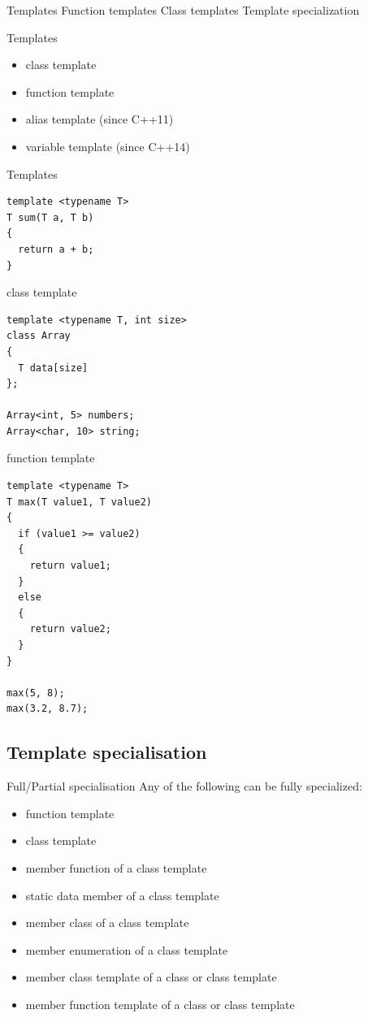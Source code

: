 \documentclass{beamer}
\begin{document}
\begin{frame}{Templates}
Function templates
Class templates
Template specialization
\end{frame}

\begin{frame}{Templates}
\begin{itemize}
  \item class template
  \item function template
  \item alias template (since C++11)
  \item variable template (since C++14)
\end{itemize}
\end{frame}

\begin{frame}[fragile]{Templates}
\begin{lstlisting}[caption=Templates]
template <typename T>
T sum(T a, T b)
{
  return a + b;
}\end{lstlisting}
\end{frame}

\begin{frame}[fragile]{class template}
\begin{lstlisting}
template <typename T, int size>
class Array
{
  T data[size]
};

Array<int, 5> numbers;
Array<char, 10> string;
\end{lstlisting}
\end{frame}

\begin{frame}[fragile]{function template}
\begin{lstlisting}
template <typename T>
T max(T value1, T value2)
{
  if (value1 >= value2)
  {
    return value1;
  }
  else
  {
    return value2;
  }
}

max(5, 8);
max(3.2, 8.7);
\end{lstlisting}
\end{frame}

\subsection{Template specialisation}
\begin{frame}{Full/Partial specialisation}
Any of the following can be fully specialized:
\begin{itemize}
  \item function template
  \item class template 
  \item member function of a class template
  \item static data member of a class template
  \item member class of a class template
  \item member enumeration of a class template
  \item member class template of a class or class template
  \item member function template of a class or class template
\end{itemize}
\end{frame}
\end{document}
